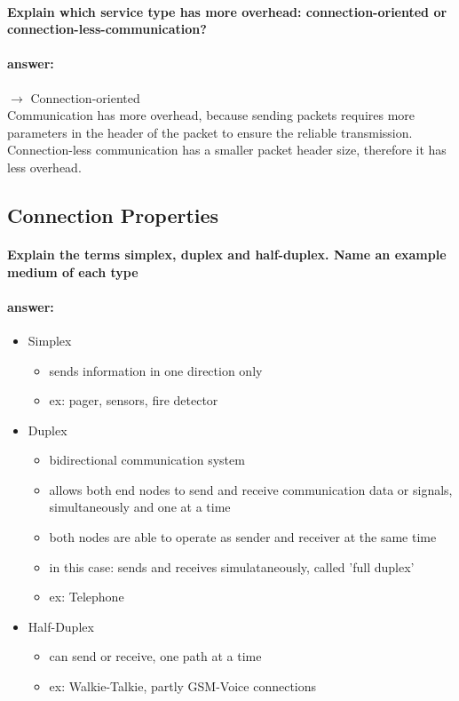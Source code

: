 \documentclass[a4paper,12pt]{article}
\begin{document}
 \paragraph{Explain which service type has more overhead: connection-oriented or connection-less-communication?} 
 \paragraph{answer:} 
 $\rightarrow$ Connection-oriented\\
 Communication has more overhead, because sending packets requires more parameters in the header of the packet to ensure the reliable transmission. Connection-less communication has a smaller packet header size, therefore it has less overhead. 
 
 
 \subsection{Connection Properties}
 \paragraph{Explain the terms simplex, duplex and half-duplex. Name an example medium of each type}
 \paragraph{answer:}
 \begin{itemize}
 	\item Simplex
 	 \begin{itemize}
 		\item  sends information in one direction only
 		\item  ex: pager, sensors, fire detector
 	\end{itemize}
 
 	\item Duplex
 	\begin{itemize}
 		\item  bidirectional communication system
 		\item  allows both end nodes to send and receive communication data or signals, simultaneously and one at a time
 		\item  both nodes are able to operate as sender and receiver at the same time
 		\item  in this case: sends and receives simulataneously, called 'full duplex'
 		\item  ex: Telephone
 	\end{itemize}
 
 	\item Half-Duplex
 	\begin{itemize}
 		\item  can send or receive, one path at a time
 		\item  ex: Walkie-Talkie, partly GSM-Voice connections
 	\end{itemize}
 \end{itemize}
 
\end{document}
